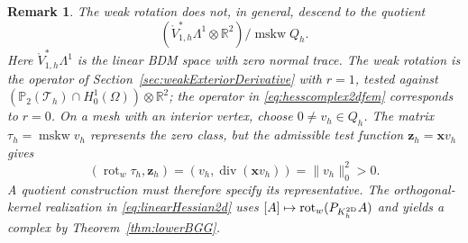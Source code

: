 \documentclass[10pt]{amsart}
\numberwithin{equation}{section}
\newtheorem{remark}[theorem]{Remark}
\renewcommand{\div}{\operatorname{div}}
\newcommand{\rot}{\operatorname{rot}}
\newcommand{\mskw}{\operatorname{mskw}}
\begin{document}
\begin{remark}\label{rem:weakRotationQuotient}\rm
The weak rotation does not, in general, descend to the quotient
\[
(\mathring V_{1,h}^*\Lambda^1\otimes\mathbb R^2)/\mskw Q_h.
\]
Here $\mathring V_{1,h}^*\Lambda^1$ is the linear BDM space with zero
normal trace. The weak rotation is the operator of
Section~\ref{sec:weakExteriorDerivative} with $r=1$, tested against
$(\mathbb P_2(\mathcal T_h)\cap H_0^1(\Omega))\otimes\mathbb R^2$;
the operator in \eqref{eq:hesscomplex2dfem} corresponds to $r=0$.
On a mesh with an interior vertex, choose $0\ne v_h\in Q_h$.
The matrix $\tau_h=\mskw v_h$ represents the zero class, but the admissible
test function $\boldsymbol z_h=\boldsymbol x v_h$ gives
\[
(\rot_w\tau_h,\boldsymbol z_h)
=(v_h,\div(\boldsymbol x v_h))
=\|v_h\|_0^2>0.
\]
A quotient construction must therefore specify its representative.
The orthogonal-kernel realization in \eqref{eq:linearHessian2d} uses
$[A]\mapsto\rot_w(P_{K_h^{\rm 2D}}A)$ and yields a complex by
Theorem~\ref{thm:lowerBGG}.
\end{remark}
\end{document}
